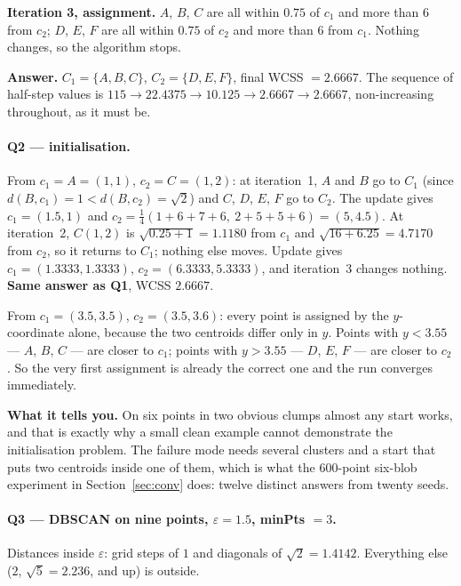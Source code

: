 \documentclass[11pt]{article}
\begin{document}
\textbf{Iteration 3, assignment.} $A$, $B$, $C$ are all within $0.75$ of
$c_1$ and more than $6$ from $c_2$; $D$, $E$, $F$ are all within $0.75$ of
$c_2$ and more than $6$ from $c_1$. Nothing changes, so the algorithm stops.

\textbf{Answer.} $C_1 = \{A,B,C\}$, $C_2 = \{D,E,F\}$, final WCSS
$= \mathbf{2.6667}$. The sequence of half-step values is
$115 \to 22.4375 \to 10.125 \to 2.6667 \to 2.6667$, non-increasing throughout,
as it must be.

\paragraph{Q2 --- initialisation.}
From $c_1 = A = (1,1)$, $c_2 = C = (1,2)$: at iteration~1, $A$ and $B$ go to
$C_1$ (since $d(B,c_1) = 1 < d(B,c_2) = \sqrt{2}$) and $C$, $D$, $E$, $F$ go
to $C_2$. The update gives $c_1 = (1.5, 1)$ and
$c_2 = \frac14(1{+}6{+}7{+}6,\ 2{+}5{+}5{+}6) = (5, 4.5)$. At iteration~2,
$C(1,2)$ is $\sqrt{0.25+1} = 1.1180$ from $c_1$ and $\sqrt{16+6.25} = 4.7170$
from $c_2$, so it returns to $C_1$; nothing else moves. Update gives
$c_1 = (1.3333, 1.3333)$, $c_2 = (6.3333, 5.3333)$, and iteration~3 changes
nothing. \textbf{Same answer as Q1}, WCSS $2.6667$.

From $c_1 = (3.5, 3.5)$, $c_2 = (3.5, 3.6)$: every point is assigned by the
$y$-coordinate alone, because the two centroids differ only in $y$. Points
with $y < 3.55$ --- $A$, $B$, $C$ --- are closer to $c_1$; points with
$y > 3.55$ --- $D$, $E$, $F$ --- are closer to $c_2$. So the very first
assignment is already the correct one and the run converges immediately.

\textbf{What it tells you.} On six points in two obvious clumps almost any
start works, and that is exactly why a small clean example cannot demonstrate
the initialisation problem. The failure mode needs several clusters and a
start that puts two centroids inside one of them, which is what the $600$-point
six-blob experiment in Section~\ref{sec:conv} does: twelve distinct answers
from twenty seeds.

\paragraph{Q3 --- DBSCAN on nine points, $\varepsilon = 1.5$, minPts $= 3$.}
Distances inside $\varepsilon$: grid steps of $1$ and diagonals of
$\sqrt{2} = 1.4142$. Everything else ($2$, $\sqrt{5} = 2.236$, and up) is
outside.
\end{document}
